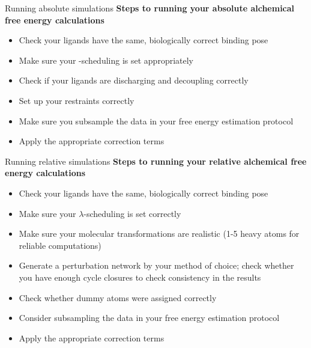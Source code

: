 \documentclass[9pt,bestpractices]{livecoms}
\begin{document}
\begin{Checklists*}
\begin{checklist}{Running absolute simulations}
        \textbf{Steps to running your absolute alchemical free energy calculations}
\begin{itemize}
 \item Check your ligands have the same, biologically correct binding pose
        \item Make sure your \textlambda-scheduling is set appropriately
        \item Check if your ligands are discharging and decoupling correctly
        \item Set up your restraints correctly
        \item Make sure you subsample the data in your free energy estimation protocol
        \item Apply the appropriate correction terms
\end{itemize}
\end{checklist}

\begin{checklist}{Running relative simulations}
        \textbf{Steps to running your relative alchemical free energy calculations}
\begin{itemize}
   \item Check your ligands  have the same, biologically correct binding pose
        \item Make sure your $\lambda$-scheduling is set correctly
        \item Make sure your molecular transformations are realistic (1-5 heavy atoms for reliable computations)
        \item Generate a perturbation network by your method of choice; check whether you have enough cycle closures to check consistency in the results
        \item Check whether dummy atoms were assigned correctly
        \item Consider subsampling the data in your free energy estimation protocol
        \item Apply the 
        appropriate correction terms
\end{itemize}
\end{checklist}
\end{Checklists*}
\end{document}
